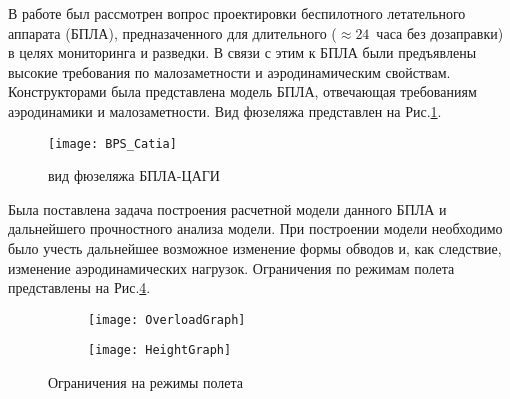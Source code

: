 В работе был рассмотрен вопрос проектировки беспилотного летательного аппарата (БПЛА), предназаченного для длительного ($\approx24$~часа без дозаправки) в целях мониторинга и разведки. В связи с этим к БПЛА были предъявлены высокие требования по малозаметности и аэродинамическим свойствам. Конструкторами была представлена модель БПЛА, отвечающая требованиям аэродинамики и малозаметности. Вид фюзеляжа представлен на Рис.\ref{fig:BPLA_TSAGI}. 

\begin{figure}[H]
\centering
\texttt{[image: BPS\_Catia]}
\caption{вид фюзеляжа БПЛА-ЦАГИ}
\label{fig:BPLA_TSAGI}
\end{figure}

Была поставлена задача построения расчетной модели данного БПЛА и дальнейшего прочностного анализа модели. При построении модели необходимо было учесть дальнейшее возможное изменение формы обводов и, как следствие, изменение аэродинамических нагрузок. Ограничения по режимам полета представлены на Рис.\ref{fig:ModeOfFlight}.
 
\begin{figure}[H]
\begin{subfigure}[b]{0.47\textwidth}
\texttt{[image: OverloadGraph]}
\label{fig:OverloadGraph}
\end{subfigure}
\begin{subfigure}[b]{0.47\textwidth}
\texttt{[image: HeightGraph]}
\label{fig:HeightGraph}
\end{subfigure}
\caption{Ограничения на режимы полета}
\label{fig:ModeOfFlight}
\end{figure}

%

